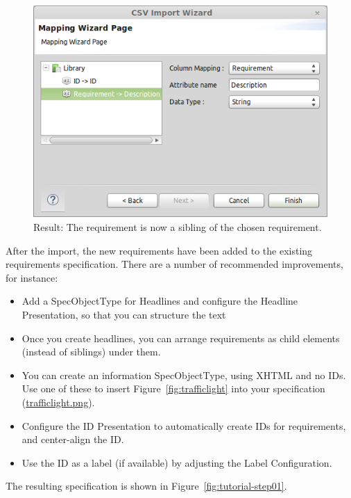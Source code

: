 \begin{figure}[h!]
  \centering
  \includegraphics[width=\linewidth]{../se-images/csv-import.png}
  \caption{Result: The requirement is now a sibling of the chosen requirement.}
  \label{fig:csv-import}
\end{figure}

After the import, the new requirements have been added to the existing requirements specification.  There are a number of recommended improvements, for instance:

\begin{itemize}
\item Add a SpecObjectType for Headlines and configure the Headline Presentation, so that you can structure the text
\item Once you create headlines, you can arrange requirements as child elements (instead of siblings) under them.
\item You can create an information SpecObjectType, using XHTML and no IDs.  Use one of these to insert Figure~\ref{fig:trafficlight} into your specification (\href{../se-materials/tutorial/trafficlight.png}{trafficlight.png}).
\item Configure the ID Presentation to automatically create IDs for requirements, and center-align the ID.
\item Use the ID as a label (if available) by adjusting the Label Configuration.
\end{itemize}

The resulting specification is shown in Figure~\ref{fig:tutorial-step01}.

